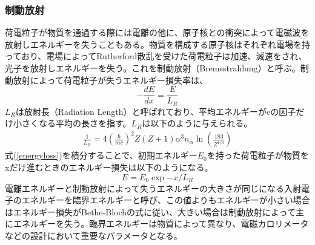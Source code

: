 \subsubsection{制動放射}
荷電粒子が物質を通過する際には電離の他に、原子核との衝突によって電磁波を放射しエネルギーを失うこともある。物質を構成する原子核はそれぞれ電場を持っており、電場によってRutherford散乱を受けた荷電粒子は加速、減速をされ、光子を放射しエネルギーを失う。これを制動放射（Bremsstrahlung）と呼ぶ。制動放射によって荷電粒子が失うエネルギー損失率は、
\begin{equation}
	\label{energyloss}
	- { \frac{dE}{dx} } = \frac{E}{L_R}
\end{equation}
$L_R$は放射長（Radiation Length）と呼ばれており、平均エネルギーがeの因子だけ小さくなる平均の長さを指す。$L_R$は以下のように与えられる。
\begin{align}
\frac{1}{L_R} = 4 {\left( \frac{\hbar}{mc} \right)}^2 Z (Z+1) {\alpha}^3 n_{\alpha} \ln(\frac{183}{Z^{1/3}})
\end{align}
式(\ref{energyloss})を積分することで、初期エネルギー$E_0$を持った荷電粒子が物質をxだけ進むときのエネルギー損失は以下のようになる。
\begin{equation}
E = E_0 \exp{-x/L_R}
\end{equation}
電離エネルギーと制動放射によって失うエネルギーの大きさが同じになる入射電子のエネルギーを臨界エネルギーと呼び、この値よりもエネルギーが小さい場合はエネルギー損失がBethe-Blochの式に従い、大きい場合は制動放射によって主にエネルギーを失う。臨界エネルギーは物質によって異なり、電磁カロリメータなどの設計において重要なパラメータとなる。
